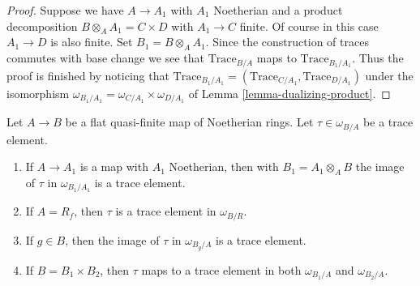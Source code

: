 \begin{proof}
Suppose we have $A \to A_1$ with $A_1$ Noetherian and
a product decomposition $B \otimes_A A_1 = C \times D$ with $A_1 \to C$
finite. Of course in this case $A_1 \to D$ is also finite.
Set $B_1 = B \otimes_A A_1$.
Since the construction of traces commutes with base change
we see that $\text{Trace}_{B/A}$ maps to $\text{Trace}_{B_1/A_1}$.
Thus the proof is finished by noticing that
$\text{Trace}_{B_1/A_1} = (\text{Trace}_{C/A_1}, \text{Trace}_{D/A_1})$
under the isomorphism
$\omega_{B_1/A_1} = \omega_{C/A_1} \times \omega_{D/A_1}$
of Lemma \ref{lemma-dualizing-product}.
\end{proof}

\begin{lemma}
\label{lemma-trace-base-change}
Let $A \to B$ be a flat quasi-finite map of Noetherian rings.
Let $\tau \in \omega_{B/A}$ be a trace element.
\begin{enumerate}
\item If $A \to A_1$ is a map with $A_1$ Noetherian, then with
$B_1 = A_1 \otimes_A B$ the image of $\tau$ in $\omega_{B_1/A_1}$ is a
trace element.
\item If $A = R_f$, then $\tau$ is a trace element in $\omega_{B/R}$.
\item If $g \in B$, then the image of $\tau$ in $\omega_{B_g/A}$
is a trace element.
\item If $B = B_1 \times B_2$, then $\tau$ maps to a trace element
in both $\omega_{B_1/A}$ and $\omega_{B_2/A}$.
\end{enumerate}
\end{lemma}

